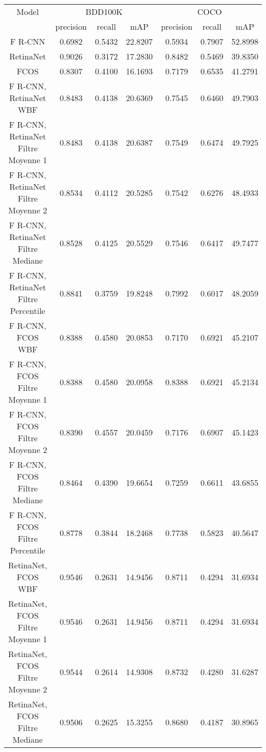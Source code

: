 \documentclass{article}
\begin{document}
\begin{table}[h!]
\centering
\begin{tabular}{|c||c|c|c||c|c|c|} 
\hline
Model & \multicolumn{3}{|c||}{BDD100K} & \multicolumn{3}{|c|}{COCO} \\ 
 & precision & recall & mAP  & precision & recall & mAP  \\ [0.5ex] 
\hline
F R-CNN & 0.6982 & 0.5432 & 22.8207 & 0.5934 & 0.7907 & 52.8998 \\ 
\hline
RetinaNet & 0.9026 & 0.3172 & 17.2830 & 0.8482 & 0.5469 & 39.8350 \\ 
\hline
FCOS & 0.8307 & 0.4100 & 16.1693 & 0.7179 & 0.6535 & 41.2791 \\ 
\hline
F R-CNN, RetinaNet WBF & 0.8483 & 0.4138 & 20.6369 & 0.7545 & 0.6460 & 49.7903 \\ 
\hline
F R-CNN, RetinaNet Filtre Moyenne 1 & 0.8483 & 0.4138 & 20.6387 & 0.7549 & 0.6474 & 49.7925 \\ 
\hline
F R-CNN, RetinaNet Filtre Moyenne 2 & 0.8534 & 0.4112 & 20.5285 & 0.7542 & 0.6276 & 48.4933 \\ 
\hline
F R-CNN, RetinaNet Filtre Mediane & 0.8528 & 0.4125 & 20.5529 & 0.7546 & 0.6417 & 49.7477 \\ 
\hline
F R-CNN, RetinaNet Filtre Percentile & 0.8841 & 0.3759 & 19.8248 & 0.7992 & 0.6017 & 48.2059 \\ 
\hline
F R-CNN, FCOS WBF & 0.8388 & 0.4580 & 20.0853 & 0.7170 & 0.6921 & 45.2107 \\ 
\hline
F R-CNN, FCOS Filtre Moyenne 1 & 0.8388 & 0.4580 & 20.0958 & 0.8388 & 0.6921 & 45.2134 \\ 
\hline
F R-CNN, FCOS Filtre Moyenne 2 & 0.8390 & 0.4557 & 20.0459 & 0.7176 & 0.6907 & 45.1423 \\ 
\hline
F R-CNN, FCOS Filtre Mediane & 0.8464 & 0.4390 & 19.6654 & 0.7259 & 0.6611 & 43.6855 \\ 
\hline
F R-CNN, FCOS Filtre Percentile & 0.8778 & 0.3844 & 18.2468 & 0.7738 & 0.5823 & 40.5647 \\ 
\hline
RetinaNet, FCOS WBF & 0.9546 & 0.2631 & 14.9456 & 0.8711 & 0.4294 & 31.6934 \\ 
\hline
RetinaNet, FCOS Filtre Moyenne 1 & 0.9546 & 0.2631 & 14.9456 & 0.8711 & 0.4294 & 31.6934 \\ 
\hline
RetinaNet, FCOS Filtre Moyenne 2 & 0.9544 & 0.2614 & 14.9308 & 0.8732 & 0.4280 & 31.6287 \\ 
\hline
RetinaNet, FCOS Filtre Mediane & 0.9506 & 0.2625 & 15.3255 & 0.8680 & 0.4187 & 30.8965 \\ 

\end{tabular}
\end{table}
\end{document}
